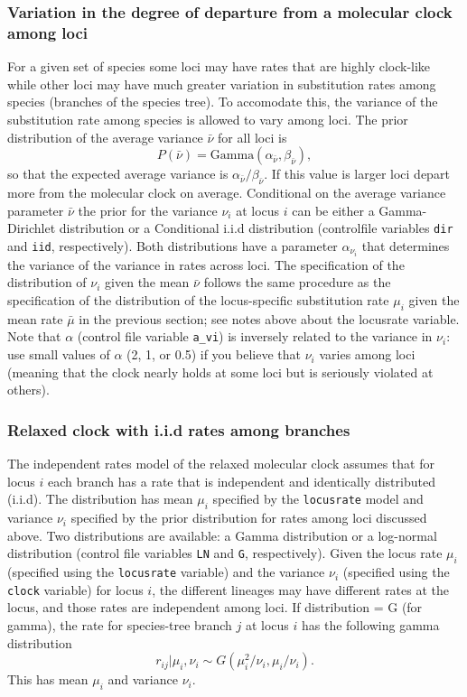 \documentclass{book}
\numberwithin{equation}{section} \renewcommand{\baselinestretch}{0.55}
\begin{document}
\subsubsection{Variation in the degree of departure from a molecular clock among loci}
For a given set of species some loci may have rates that are highly
clock-like while other loci may have much greater variation in
substitution rates among species (branches of the species tree). To
accomodate this, the variance of the substitution rate among species
is allowed to vary among loci. The prior distribution of the average
variance $\bar{\nu}$ for all loci is
\begin{displaymath}
  P(\bar{\nu}) = \textrm{Gamma}(\alpha_{\bar{\nu}},\beta_{\bar{\nu}}),
\end{displaymath}
so that the expected average variance is
$\alpha_{\bar{\nu}}/\beta_{\bar{\nu}}$.  If this value is larger loci
depart more from the molecular clock on average.  Conditional on the
average variance parameter $\bar{\nu}$ the prior for the variance
$\nu_i$ at locus $i$ can be either a Gamma-Dirichlet distribution or a
Conditional i.i.d distribution (controlfile variables \texttt{dir} and
\texttt{iid}, respectively).  Both distributions have a parameter
$\alpha_{\nu_i}$ that determines the variance of the variance in rates
across loci.  The specification of the distribution of $\nu_i$ given
the mean $\bar\nu$ follows the same procedure as the specification of
the distribution of the locus-specific substitution rate $\mu_i$ given
the mean rate $\bar\mu$ in the previous section; see notes above about
the locusrate variable.  Note that $\alpha$ (control file variable
\texttt{a\_vi}) is inversely related to the variance in $\nu_i$: use
small values of $\alpha$ (2, 1, or 0.5) if you believe that $\nu_i$
varies among loci (meaning that the clock nearly holds at some loci
but is seriously violated at others).

\subsubsection{Relaxed clock with i.i.d rates among branches}
The independent rates model of the relaxed molecular clock assumes
that for locus $i$ each branch has a rate that is independent and
identically distributed (i.i.d). The distribution has mean $\mu_i$
specified by the \texttt{locusrate} model and variance $\nu_i$
specified by the prior distribution for rates among loci discussed
above.  Two distributions are available: a Gamma distribution or a
log-normal distribution (control file variables \texttt{LN} and
\texttt{G}, respectively).  Given the locus rate $\mu_i$ (specified
using the \texttt{locusrate} variable) and the variance $\nu_i$
(specified using the \texttt{clock} variable) for locus $i$, the
different lineages may have different rates at the locus, and those
rates are independent among loci.  If distribution = G (for gamma),
the rate for species-tree branch $j$ at locus $i$ has the following
gamma distribution
\begin{equation}
  r_{ij} | \mu_i, \nu_i \sim G(\mu_i^2/\nu_i, \mu_i/\nu_i).
\end{equation}
This has mean $\mu_i$ and variance $\nu_i$.
\end{document}
